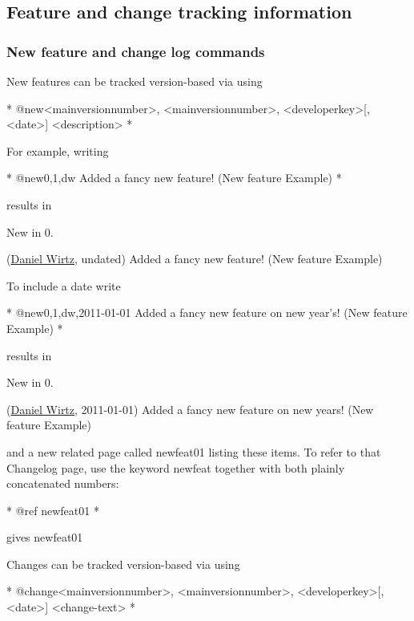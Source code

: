 \hypertarget{tips_tip_versioning}{}\subsection{Feature and change tracking information}\label{tips_tip_versioning}
\hypertarget{tips_dg_featchange}{}\subsubsection{New feature and change log commands}\label{tips_dg_featchange}
New features can be tracked version-\/based via using \begin{DoxyVerb}*  @new{<mainversionnumber>, <mainversionnumber>, <developerkey>[, <date>]} <description>
*  \end{DoxyVerb}


For example, writing \begin{DoxyVerb}*  @new{0,1,dw} Added a fancy new feature! (New feature Example)
*  \end{DoxyVerb}
 results in \begin{DoxyRefDesc}{New in 0.}
\item[\hyperlink{newfeat0_1__newfeat0_1000002}{New in 0.\+1}](\hyperlink{developers_dw}{Daniel Wirtz}, undated) Added a fancy new feature! (New feature Example)\end{DoxyRefDesc}


To include a date write \begin{DoxyVerb}*  @new{0,1,dw,2011-01-01} Added a fancy new feature on new year's! (New feature Example)
*  \end{DoxyVerb}
 results in \begin{DoxyRefDesc}{New in 0.}
\item[\hyperlink{newfeat0_1__newfeat0_1000003}{New in 0.\+1}](\hyperlink{developers_dw}{Daniel Wirtz}, 2011-\/01-\/01) Added a fancy new feature on new year\textquotesingle{}s! (New feature Example)\end{DoxyRefDesc}


and a new related page called newfeat01 listing these items. To refer to that Changelog page, use the keyword \textquotesingle{}newfeat\textquotesingle{} together with both plainly concatenated numbers\+: \begin{DoxyVerb}*  @ref newfeat01
*  \end{DoxyVerb}
 gives newfeat01

Changes can be tracked version-\/based via using \begin{DoxyVerb}*  @change{<mainversionnumber>, <mainversionnumber>, <developerkey>[, <date>]} <change-text>
*  \end{DoxyVerb}


